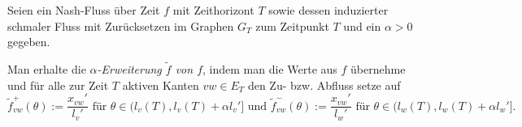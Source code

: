 \begin{definition}
	Seien ein Nash-Fluss über Zeit $f$ mit Zeithorizont $T$ sowie dessen induzierter schmaler Fluss mit Zurücksetzen im Graphen $G_T$ zum Zeitpunkt $T$ und ein $\alpha > 0$ gegeben.
	
	
	Man erhalte die \emph{$\alpha$-Erweiterung $\tilde{f}$ von $f$}, indem man die Werte aus $f$ übernehme und für alle zur Zeit $T$ aktiven Kanten $vw\in E_T$ den Zu- bzw. Abfluss setze auf
	$$\tilde{f}_{vw}^+(\theta):= \frac{x_{vw}'}{l_v'} \text{ für $\theta\in (l_v(T), l_v(T)+\alpha l_v']$ und } \tilde{f}_{vw}^-(\theta):=\frac{x_{vw}'}{l_w'} \text{ für $\theta\in (l_w(T), l_w(T)+\alpha l_w']$.}$$
\end{definition}

